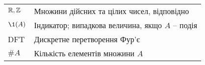 


\begin{tabular}{ll}

    $\mathbb R, \mathbb Z$ & Множини дійсних та цілих чисел, відповідно \\
    $\1(A)$ & Індикатор; випадкова величина, якщо $A$ -- подія\\
    DFT & Дискретне перетворення Фур'є\\
    $\# A$ & Кількість елементів множини $A$\\


\end{tabular}